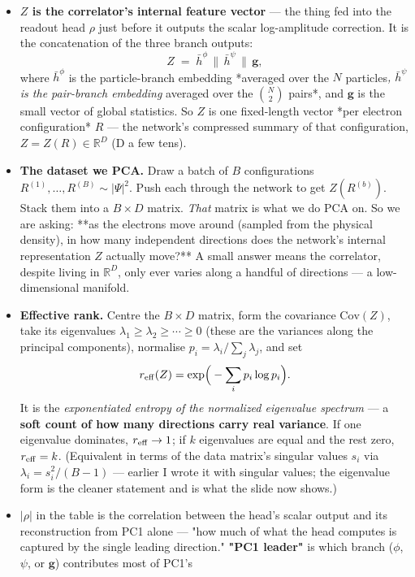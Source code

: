 \documentclass[11pt]{article}
\begin{document}
\begin{itemize}
\item \textbf{$Z$ is the correlator's internal feature vector} --- the thing fed into
the readout head $\rho$ just before it outputs the scalar log-amplitude
correction. It is the concatenation of the three branch outputs:
\[Z \;=\; \bar h^\phi \,\big\|\, \bar h^\psi \,\big\|\, \mathbf g,\]
where $\bar h^\phi$ is the particle-branch embedding *averaged over the
$N$ particles\emph{, $\bar h^\psi$ is the pair-branch embedding }averaged over
the $\binom N2$ pairs*, and $\mathbf g$ is the small vector of global
statistics. So $Z$ is one fixed-length vector *per electron
configuration* $R$ --- the network's compressed summary of that
configuration, $Z = Z(R) \in \mathbb R^{D}$ (D a few tens).
\item \textbf{The dataset we PCA.} Draw a batch of $B$ configurations $R^{(1)},
  \dots, R^{(B)} \sim |\Psi|^2$. Push each through the network to get
$Z(R^{(b)})$. Stack them into a $B \times D$ matrix. \emph{That} matrix is what
we do PCA on. So we are asking: **as the electrons move around (sampled
from the physical density), in how many independent directions does the
network's internal representation $Z$ actually move?** A small answer
means the correlator, despite living in $\mathbb R^D$, only ever varies
along a handful of directions --- a low-dimensional manifold.
\item \textbf{Effective rank.} Centre the $B\times D$ matrix, form the covariance
$\mathrm{Cov}(Z)$, take its eigenvalues $\lambda_1 \ge \lambda_2 \ge
  \cdots \ge 0$ (these are the variances along the principal components),
normalise $p_i = \lambda_i / \sum_j \lambda_j$, and set
\[r_{\rm eff}(Z) = \exp\!\Big(-\sum_i p_i \log p_i\Big).\]
It is the \emph{exponentiated entropy of the normalized eigenvalue spectrum} ---
a \textbf{soft count of how many directions carry real variance}. If one
eigenvalue dominates, $r_{\rm eff}\to 1$; if $k$ eigenvalues are equal and
the rest zero, $r_{\rm eff}=k$. (Equivalent in terms of the data matrix's
singular values $s_i$ via $\lambda_i = s_i^2/(B-1)$ --- earlier I wrote it
with singular values; the eigenvalue form is the cleaner statement and is
what the slide now shows.)
\item \textbf{$|\rho|$} in the table is the correlation between the head's scalar
output and its reconstruction from PC1 alone --- "how much of what the head
computes is captured by the single leading direction." \textbf{"PC1 leader"} is
which branch ($\phi$, $\psi$, or $\mathbf g$) contributes most of PC1's

\end{itemize}
\end{document}
